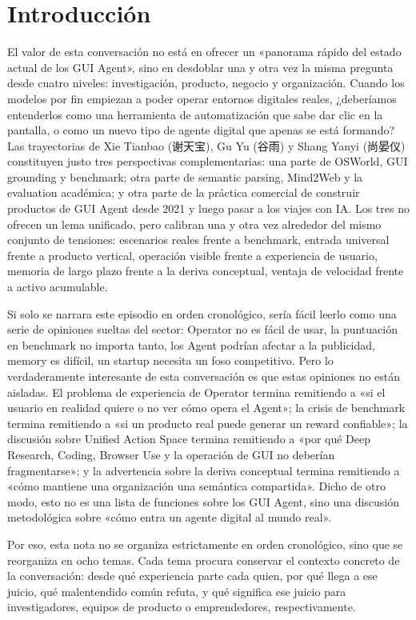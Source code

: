 \section*{Introducción}

El valor de esta conversación no está en ofrecer un «panorama rápido del estado actual de los GUI Agent», sino en desdoblar una y otra vez la misma pregunta desde cuatro niveles: investigación, producto, negocio y organización. Cuando los modelos por fin empiezan a poder operar entornos digitales reales, ¿deberíamos entenderlos como una herramienta de automatización que sabe dar clic en la pantalla, o como un nuevo tipo de agente digital que apenas se está formando? Las trayectorias de Xie Tianbao (谢天宝), Gu Yu (谷雨) y Shang Yanyi (尚晏仪) constituyen justo tres perspectivas complementarias: una parte de OSWorld, GUI grounding y benchmark; otra parte de semantic parsing, Mind2Web y la evaluation académica; y otra parte de la práctica comercial de construir productos de GUI Agent desde 2021 y luego pasar a los viajes con IA. Los tres no ofrecen un lema unificado, pero calibran una y otra vez alrededor del mismo conjunto de tensiones: escenarios reales frente a benchmark, entrada universal frente a producto vertical, operación visible frente a experiencia de usuario, memoria de largo plazo frente a la deriva conceptual, ventaja de velocidad frente a activo acumulable.

Si solo se narrara este episodio en orden cronológico, sería fácil leerlo como una serie de opiniones sueltas del sector: Operator no es fácil de usar, la puntuación en benchmark no importa tanto, los Agent podrían afectar a la publicidad, memory es difícil, un startup necesita un foso competitivo. Pero lo verdaderamente interesante de esta conversación es que estas opiniones no están aisladas. El problema de experiencia de Operator termina remitiendo a «si el usuario en realidad quiere o no ver cómo opera el Agent»; la crisis de benchmark termina remitiendo a «si un producto real puede generar un reward confiable»; la discusión sobre Unified Action Space termina remitiendo a «por qué Deep Research, Coding, Browser Use y la operación de GUI no deberían fragmentarse»; y la advertencia sobre la deriva conceptual termina remitiendo a «cómo mantiene una organización una semántica compartida». Dicho de otro modo, esto no es una lista de funciones sobre los GUI Agent, sino una discusión metodológica sobre «cómo entra un agente digital al mundo real».

Por eso, esta nota no se organiza estrictamente en orden cronológico, sino que se reorganiza en ocho temas. Cada tema procura conservar el contexto concreto de la conversación: desde qué experiencia parte cada quien, por qué llega a ese juicio, qué malentendido común refuta, y qué significa ese juicio para investigadores, equipos de producto o emprendedores, respectivamente.

